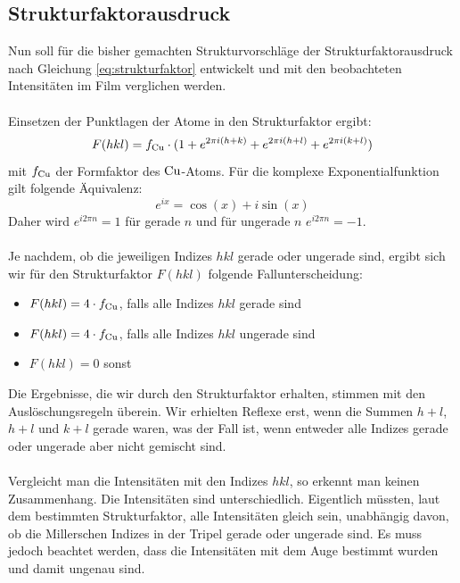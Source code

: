 \documentclass[a4paper,titlepage]{scrartcl}
\numberwithin{equation}{section}
\begin{document}
\subsection{Strukturfaktorausdruck}
Nun soll für die bisher gemachten Strukturvorschläge der Strukturfaktorausdruck nach Gleichung \ref{eq:strukturfaktor} entwickelt und mit den beobachteten Intensitäten im Film verglichen werden.\\ \\
Einsetzen der Punktlagen der Atome in den Strukturfaktor ergibt:
\begin{equation*}
F(hkl)=f_{\ce{Cu}} \cdot (1 + e^{2 \pi i (h+k)} + e^{2 \pi i (h + l)} + e^{2 \pi i (k + l)})
\end{equation*}
mit $f_{\ce{Cu}}$ der Formfaktor des $\ce{Cu}$-Atoms. Für die komplexe Exponentialfunktion gilt folgende Äquivalenz:
\begin{equation*}
e^{ix}=\cos{(x)} + i \sin{(x)}
\end{equation*}
Daher wird $e^{i 2 \pi n}=1$ für gerade $n$ und für ungerade $n$ $e^{i 2 \pi n}=-1$.\\ \\
Je nachdem, ob die jeweiligen Indizes $hkl$ gerade oder ungerade sind, ergibt sich wir für den Strukturfaktor $F(hkl)$ folgende Fallunterscheidung:
\begin{itemize}
\item $F(hkl)=4 \cdot f_{\ce{Cu}}$, falls alle Indizes $hkl$ gerade sind
\item $F(hkl)=4 \cdot f_{\ce{Cu}}$, falls alle Indizes $hkl$ ungerade sind
\item $F(hkl)=0$ sonst
\end{itemize}
Die Ergebnisse, die wir durch den Strukturfaktor erhalten, stimmen mit den Auslöschungsregeln überein. Wir erhielten Reflexe erst, wenn die Summen $h+l$, $h+l$ und $k+l$ gerade waren, was der Fall ist, wenn entweder alle Indizes gerade oder ungerade aber nicht gemischt sind.\\ \\
Vergleicht man die Intensitäten mit den Indizes $hkl$, so erkennt man keinen Zusammenhang. Die Intensitäten sind unterschiedlich. Eigentlich müssten, laut dem bestimmten Strukturfaktor, alle Intensitäten gleich sein, unabhängig davon, ob die Millerschen Indizes in der Tripel gerade oder ungerade sind. Es muss jedoch beachtet werden, dass die Intensitäten mit dem Auge bestimmt wurden und damit ungenau sind.
\end{document}
